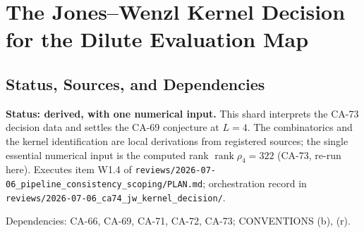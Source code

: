 
\section{The Jones--Wenzl Kernel Decision for the Dilute Evaluation Map}
\label{sec:jw-kernel-decision}

\subsection{Status, Sources, and Dependencies}

\textbf{Status: derived, with one numerical input.}  This shard interprets
the CA-73 decision data and settles the CA-69 conjecture at \(L=4\).  The
combinatorics and the kernel identification are local derivations from
registered sources; the single essential numerical input is the computed
rank \(\operatorname{rank}\rho_4=322\) (CA-73, re-run here).  Executes item
W1.4 of \texttt{reviews/2026-07-06\_pipeline\_consistency\_scoping/PLAN.md};
orchestration record in
\texttt{reviews/2026-07-06\_ca74\_jw\_kernel\_decision/}.

Dependencies: CA-66, CA-69, CA-71, CA-72, CA-73; CONVENTIONS (b), (r).

